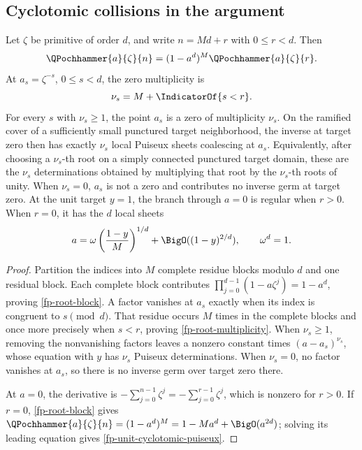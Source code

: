\subsection{Cyclotomic collisions in the argument}

\begin{theorem}
\label{fp-cyclotomic-argument}
Let \(\zeta\) be primitive of order \(d\), and write \(n=Md+r\) with
\(0\leq r<d\).  Then
\begin{equation}
 \QPochhammer{a}{\zeta}{n}=(1-a^d)^M\QPochhammer{a}{\zeta}{r}.
 \label{fp-root-block}
\end{equation}
At \(a_s=\zeta^{-s}\), \(0\leq s<d\), the zero multiplicity is
\begin{equation}
 \nu_s=M+\IndicatorOf{s<r}.
 \label{fp-root-multiplicity}
\end{equation}
For every \(s\) with \(\nu_s\ge1\), the point \(a_s\) is a zero of
multiplicity \(\nu_s\).  On the ramified cover of a sufficiently small
punctured target neighborhood, the inverse at target zero then has exactly
\(\nu_s\) local Puiseux sheets coalescing at \(a_s\).  Equivalently, after
choosing a \(\nu_s\)-th root on a simply connected punctured target domain,
these are the \(\nu_s\) determinations obtained by multiplying that root by
the \(\nu_s\)-th roots of unity.  When \(\nu_s=0\), \(a_s\) is not a zero
and contributes no inverse germ at target zero.
At the unit target \(y=1\), the branch through \(a=0\) is regular when
\(r>0\).  When \(r=0\), it has the \(d\) local sheets
\begin{equation}
 a=\omega\left(\frac{1-y}{M}\right)^{1/d}
   +\BigO((1-y)^{2/d}),\qquad \omega^d=1.
 \label{fp-unit-cyclotomic-puiseux}
\end{equation}
\end{theorem}

\begin{proof}
Partition the indices into \(M\) complete residue blocks modulo \(d\) and one
residual block.  Each complete block contributes
\(\prod_{j=0}^{d-1}(1-a\zeta^j)=1-a^d\), proving
\cref{fp-root-block}.  A factor vanishes at \(a_s\) exactly when its index is
congruent to \(s\pmod d\).  That residue occurs \(M\) times in the complete
blocks and once more precisely when \(s<r\), proving
\cref{fp-root-multiplicity}.  When \(\nu_s\ge1\), removing the nonvanishing
factors leaves a nonzero constant times \((a-a_s)^{\nu_s}\), whose equation
with \(y\) has \(\nu_s\) Puiseux determinations.  When \(\nu_s=0\), no factor
vanishes at \(a_s\), so there is no inverse germ over target zero there.

At \(a=0\), the derivative is
\(-\sum_{j=0}^{n-1}\zeta^j=-\sum_{j=0}^{r-1}\zeta^j\), which is nonzero for
\(r>0\).  If \(r=0\), \cref{fp-root-block} gives
\(\QPochhammer{a}{\zeta}{n}=(1-a^d)^M=1-Ma^d+\BigO(a^{2d})\); solving its leading equation
gives \cref{fp-unit-cyclotomic-puiseux}.
\end{proof}


